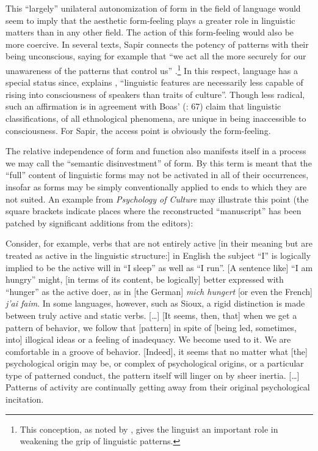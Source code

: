 \documentclass[output=paper]{langscibook}
\begin{document}
This ``largely'' unilateral autonomization of form in the field of language would seem to imply that the aesthetic form-feeling plays a greater role in linguistic matters than in any other field. The action of this form-feeling would also be more coercive. In several texts, Sapir connects the potency of patterns with their being unconscious, saying for example that ``we act all the more securely for our unawareness of the patterns that control us'' \citep[549]{Sapir1927a}.\footnote{This conception, as noted by \citet{Joseph2002sapirwhorf}, gives the linguist an important role in weakening the grip of linguistic patterns.} In this respect, language has a special status since, explains \citet[100]{Sapir1912}, ``linguistic features are necessarily less capable of rising into consciousness of speakers than traits of culture''. Though less radical, such an affirmation is in agreement with Boas' (\citeyear{Boas1911}: 67) claim that linguistic classifications, of all ethnological phenomena, are unique in being inaccessible to consciousness. For Sapir, the access point is obviously the form-feeling. 

The relative independence of form and function also manifests itself in a process we may call the ``semantic disinvestment'' of form. By this term is meant that the ``full'' content of linguistic forms may not be activated in all of their occurrences, insofar as forms may be simply conventionally applied to ends to which they are not suited. An example from \emph{Psychology of Culture} may illustrate this point (the square brackets indicate places where the reconstructed ``manuscript'' has been patched by significant additions from the editors): 

\begin{modquote}
Consider, for example, verbs that are not entirely active [in their meaning but are treated as active in the linguistic structure:] in English the subject ``I'' is logically implied to be the active will in ``I sleep'' as well as ``I run''. [A sentence like] ``I am hungry'' might, [in terms of its content, be logically] better expressed with ``hunger'' as the active doer, as in [the German] \emph{mich hungert} [or even the French] \emph{j’ai faim}. In some languages, however, such as Sioux, a rigid distinction is made between truly active and static verbs. […] [It seems, then, that] when we get a pattern of behavior, we follow that [pattern] in spite of [being led, sometimes, into] illogical ideas or a feeling of inadequacy. We become used to it. We are comfortable in a groove of behavior. [Indeed], it seems that no matter what [the] psychological origin may be, or complex of psychological origins, or a particular type of patterned conduct, the pattern itself will linger on by sheer inertia. […] Patterns of activity are continually getting away from their original psychological incitation. \citep[109--110]{Sapir2002}
\end{modquote}
\end{document}
